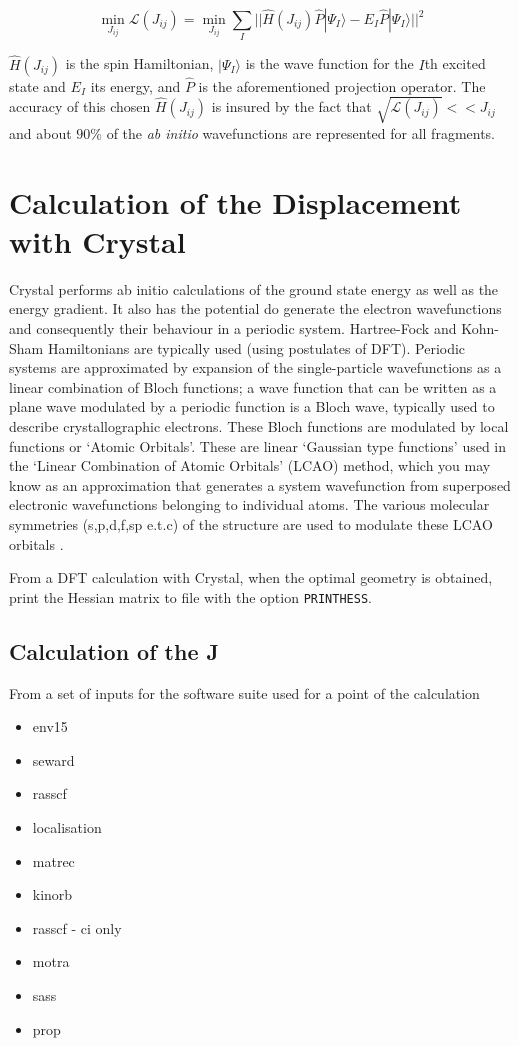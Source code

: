 \documentclass[10pt]{article}
\begin{document}
\begin{equation*}
	\min_{J_{ij}} \mathcal{L}(J_{ij}) = \min_{J_{ij}} \sum_I ||\hat{H}(J_{ij})\hat{P}|\Psi_I\rangle-E_I\hat{P}|\Psi_I\rangle||^2
\end{equation*}

$\hat{H}(J_{ij})$ is the spin Hamiltonian, $|\Psi_I\rangle$ is the wave function for the $I$th excited state and $E_I$ its energy, and $\hat{P}$ is the aforementioned projection operator. The accuracy of this chosen $\hat{H}(J_{ij})$ is insured by the fact that $\sqrt{\mathcal{L}(J_{ij})} << J_{ij}$ and about $90\%$ of the \textit{ab initio} wavefunctions are represented for all fragments. 

\section{Calculation of the Displacement with Crystal}
Crystal performs ab initio calculations of the ground state energy as well as the energy gradient. It also has the potential do generate the electron wavefunctions and consequently their behaviour in a periodic system. Hartree-Fock and Kohn-Sham Hamiltonians are typically used (using postulates of DFT). Periodic systems are approximated by expansion of the single-particle wavefunctions as a linear combination of Bloch functions; a wave function that can be written as a plane wave modulated by a periodic function is a Bloch wave, typically used to describe crystallographic electrons. These Bloch functions are modulated by local functions or `Atomic Orbitals'. These are linear `Gaussian type functions' used in the `Linear Combination of Atomic Orbitals' (LCAO) method, which you may know as an approximation that generates a system wavefunction from superposed electronic wavefunctions belonging to individual atoms. The various molecular symmetries (s,p,d,f,sp e.t.c) of the structure are used to modulate these LCAO orbitals \cite{dovesi2017crystal17}.

From a DFT calculation with Crystal, when the optimal geometry is obtained, print the Hessian matrix to file with the option \verb|PRINTHESS|. 


\subsection{Calculation of the J}

From a set of inputs for the software suite used for a point of the calculation
\begin{itemize}
	\item env15
	\item seward
	\item rasscf
	\item localisation
	\item matrec
	\item kinorb
	\item rasscf - ci only
	\item motra
	\item sass
	\item prop
\end{itemize}
\end{document}

